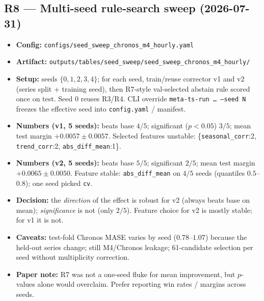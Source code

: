 
\subsection*{R8 --- Multi-seed rule-search sweep (2026-07-31)}
\begin{itemize}
  \item \textbf{Config:} \texttt{configs/seed\_sweep\_chronos\_m4\_hourly.yaml}
  \item \textbf{Artifact:}
        \texttt{outputs/tables/seed\_sweep/seed\_sweep\_chronos\_m4\_hourly/}
  \item \textbf{Setup:} seeds $\{0,1,2,3,4\}$; for each seed, train/reuse
        corrector v1 and v2 (series split + training seed), then R7-style
        val-selected abstain rule scored once on test. Seed 0 reuses R3/R4.
        CLI override \texttt{meta-ts-run \ldots{} --seed N} freezes the effective
        seed into \texttt{config.yaml} / manifest.
  \item \textbf{Numbers (v1, 5 seeds):} beats base $4/5$; significant
        ($p<0.05$) $3/5$; mean test margin $+0.0057\pm0.0057$.
        Selected features unstable:
        \{\texttt{seasonal\_corr}:2, \texttt{trend\_corr}:2,
        \texttt{abs\_diff\_mean}:1\}.
  \item \textbf{Numbers (v2, 5 seeds):} beats base $5/5$; significant $2/5$;
        mean test margin $+0.0065\pm0.0050$.
        Feature stable: \texttt{abs\_diff\_mean} on $4/5$ seeds
        (quantiles $0.5$--$0.8$); one seed picked \texttt{cv}.
  \item \textbf{Decision:} the \emph{direction} of the effect is robust for v2
        (always beats base on mean); \emph{significance} is not (only $2/5$).
        Feature choice for v2 is mostly stable; for v1 it is not.
  \item \textbf{Caveats:} test-fold Chronos MASE varies by seed
        ($0.78$--$1.07$) because the held-out series change; still M4/Chronos
        leakage; 61-candidate selection per seed without multiplicity correction.
  \item \textbf{Paper note:} R7 was not a one-seed fluke for mean improvement,
        but $p$-values alone would overclaim. Prefer reporting win rates /
        margins across seeds.
\end{itemize}

